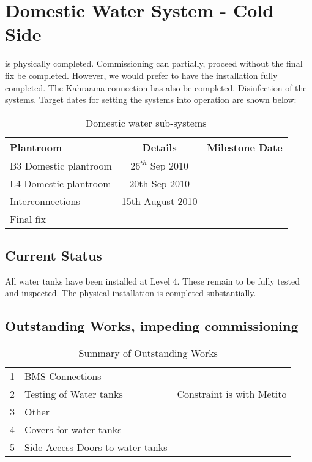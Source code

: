 \chapter{Domestic Water System - Cold Side}

 is physically completed. Commissioning can partially, proceed without the final fix be completed. However, we would prefer to have the installation fully completed. The Kahraama connection has also be completed. Disinfection of the systems. Target dates for setting the systems into operation are shown below:

\begin{center}
           \begin{table} 
	    \begin{tabular}{lcl}
	      \toprule
	      Plantroom   &  Details & Milestone Date  \\
	      \midrule
	      B3 Domestic plantroom      &  $26^{th}$ Sep 2010  \\
	      L4 Domestic plantroom      &  20th Sep 2010  \\
	      Interconnections           &  15th August 2010  \\
	      Final fix  && \\ 
	      \bottomrule
	    \end{tabular}
           \caption{Domestic water sub-systems}
            \end{table}
   \end{center}


\section{Current Status}

All water tanks have been installed at Level 4. These remain to be fully tested and inspected. The physical installation is completed substantially. 

\section{Outstanding Works, impeding commissioning}

\begin{table}[ht]
\begin{tabular}{lll}
1  &BMS Connections & \\
2  &Testing of Water tanks &Constraint is with Metito\\
3  &Other                  &\\
4  &Covers for water tanks &\\
5  &Side Access Doors to water tanks   &\\
\end{tabular}
\caption{Summary of Outstanding Works}
\end{table}

